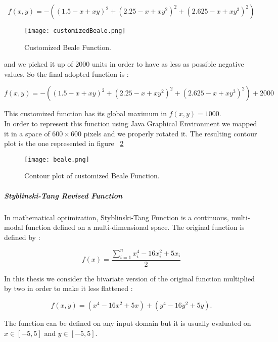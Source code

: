 \begin{equation}
f(x, y) = -((1.5 - x + xy)^2 + (2.25 - x + xy^2)^2 + (2.625 - x + xy^3)^2)
\end{equation}

\begin{figure}[h!]
	\centering
	\texttt{[image: customizedBeale.png]}
	\caption{Customized Beale Function.}
	\label{fig:CustomizedBealeFunction}
\end{figure}

and we picked it up of $2000$ units in order to have as less as possible negative values. So the final adopted function is :

\begin{equation}
f(x, y) = -((1.5 - x + xy)^2 + (2.25 - x + xy^2)^2 + (2.625 - x + xy^3)^2) + 2000
\end{equation}

This customized function has its global maximum in $f(x, y) = 1000$. \\

In order to represent this function using Java Graphical Environment we mapped it in a space of $600 \times 600$ pixels and we properly rotated it. The resulting contour plot is the one represented in figure ~\ref{fig:ContourPlotCustomizedBealeFunction} 

\begin{figure}[h!]
	\centering
	\texttt{[image: beale.png]}
	\caption{Contour plot of customized Beale Function.}
	\label{fig:ContourPlotCustomizedBealeFunction}
\end{figure}

\subparagraph{Styblinski-Tang Revised Function} In mathematical optimization, Styblinski-Tang Function is a continuous, multi-modal function defined on a multi-dimensional space. The original function is defined by :

\begin{equation}
	f(x) = \dfrac{\sum_{i=1}^{n} x_{i}^4 -16x_{i}^2 +5x_{i}}{2}
\end{equation}

In this thesis we consider the bivariate version of the original function multiplied by two in order to make it less flattened :

\begin{equation}
f(x, y) = (x^4 - 16x^2 + 5x) + (y^4 - 16y^2 + 5y).
\end{equation}

The function can be defined on any input domain but it is usually evaluated on $x \in [-5, 5]$ and $y \in [-5, 5]$. \\

